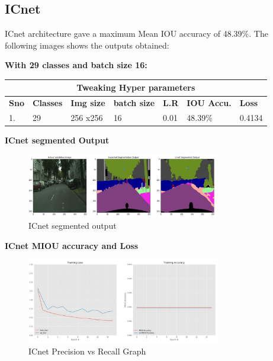 \documentclass{IEEEtran}
\begin{document}
\subsection{\textbf{ICnet}} ICnet architecture gave a maximum Mean IOU accuracy of 48.39\%. The following images shows the outputs obtained:

\textbf{With 29 classes and batch size 16:}
\newline

\begin{tabular}{ |p{0.6cm}|p{1.2cm}|p{0.6cm}|p{0.6cm}|p{0.6cm}|p{0.8cm}|p{0.8cm}|}
 \hline
 \multicolumn{7}{|c|}{\textbf{Tweaking Hyper parameters}} \\
 \hline
 \textbf{Sno} & \textbf{Classes} & \textbf{Img size} & \textbf{batch size} & \textbf{L.R} & \textbf{IOU Accu.} & \textbf{Loss} \\
 \hline
 1. & 29   & 256 x256   & 16  & 0.01 & 48.39\% & 0.4134 \\
 \hline
\end{tabular}

\textbf{ICnet segmented Output}

\begin{figure}[h]
    \centering
    \captionsetup{justification=centering}
    \includegraphics[width=8.5cm]{icnet-cityscrapes-B16-im.JPG}
    \caption{ICnet segmented output}
    \label{fig:Binary class segmented output}
\end{figure}


\textbf{ICnet MIOU accuracy and Loss}

\begin{figure}[h]
    \centering
    \captionsetup{justification=centering}
    \includegraphics[width=8.5cm]{ICnet-cityscrapes-B16-gr.JPG}
    \caption{ICnet Precision vs Recall Graph}
    \label{fig:Binary class segmented output}
\end{figure}
\end{document}
